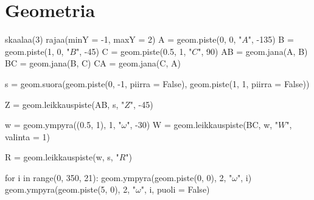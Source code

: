 \section{Geometria}
\begin{kuva}
skaalaa(3)
rajaa(minY = -1, maxY = 2)
A = geom.piste(0, 0, "$A$", -135)
B = geom.piste(1, 0, "$B$", -45)
C = geom.piste(0.5, 1, "$C$", 90)
AB = geom.jana(A, B)
BC = geom.jana(B, C)
CA = geom.jana(C, A)

s = geom.suora(geom.piste(0, -1, piirra = False), geom.piste(1, 1, piirra = False))

Z = geom.leikkauspiste(AB, s, "$Z$", -45)

w = geom.ympyra((0.5, 1), 1, "$\omega$", -30)
W = geom.leikkauspiste(BC, w, "$W$", valinta = 1)

R = geom.leikkauspiste(w, s, "$R$")
\end{kuva}

\begin{kuva}
for i in range(0, 350, 21):
	geom.ympyra(geom.piste(0, 0), 2, "$\omega$", i)
	geom.ympyra(geom.piste(5, 0), 2, "$\omega$", i, puoli = False)

\end{kuva}
